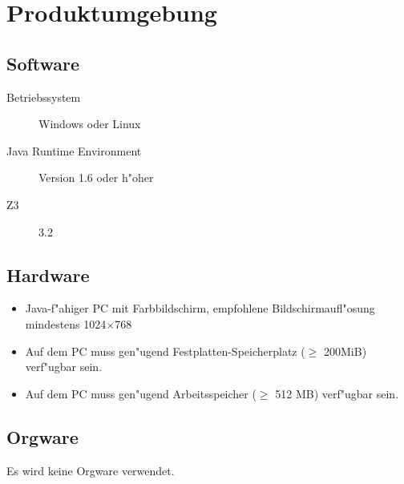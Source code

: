 \section{Produktumgebung}%

\subsection{Software}%

\begin{description}%
    \item [Betriebssystem] \see Windows oder \see Linux%
    \item [\see Java Runtime Environment] Version 1.6 oder h"oher%
    \item [\see Z3] 3.2%
\end{description}%

\subsection{Hardware}%


\begin{itemize}%
    \item \see Java-f"ahiger PC mit Farbbildschirm, empfohlene Bildschirmaufl"osung mindestens 1024$\times$768%
    \item Auf dem PC muss gen"ugend Festplatten-Speicherplatz ($\ge$ 200MiB) verf"ugbar sein.%
    \item Auf dem PC muss gen"ugend Arbeitsspeicher ($\ge$ 512 MB) verf"ugbar sein.%
\end{itemize}%

\subsection{Orgware}%

Es wird keine \see Orgware verwendet.%

